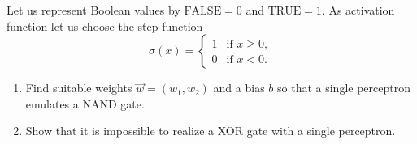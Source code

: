 \begin{Problem}
	Let us represent Boolean values by $\text{FALSE}=0$ and $\text{TRUE}=1$. As activation function let us choose the step function
	\[
	\sigma(x)=
	\begin{cases}
		1 & \text{if } x\ge 0,\\
		0 & \text{if } x<0.
	\end{cases}
	\]
	
	\begin{enumerate}
		\item[(a)] Find suitable weights $\vec w=(w_1,w_2)$ and a bias $b$ so that a single perceptron emulates a NAND gate.
		
		\item[(b)] Show that it is impossible to realize a XOR gate with a single perceptron.
	\end{enumerate}
\end{Problem}
